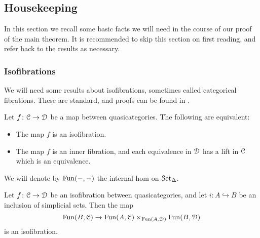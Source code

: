 \documentclass[main.tex]{subfiles}
\begin{document}
%


\subsection{Housekeeping}

In this section we recall some basic facts we will need in the course of our proof of the main theorem. It is recommended to skip this section on first reading, and refer back to the results as necessary.

\subsubsection{Isofibrations}

We will need some results about isofibrations, sometimes called categorical fibrations. These are standard, and proofs can be found in \cite{kerodon}.

\begin{proposition}
  \label{prop:characterization_of_isofibrations}
  Let $f\colon \mathcal{C} \to \mathcal{D}$ be a map between quasicategories. The following are equivalent:
  \begin{itemize}
    \item The map $f$ is an isofibration.

    \item The map $f$ is an inner fibration, and each equivalence in $\mathcal{D}$ has a lift in $\mathcal{C}$ which is an equivalence.
  \end{itemize}
\end{proposition}

We will denote by $\mathrm{Fun}(-, -)$ the internal hom on $\mathcal{S}\mathrm{et}_{\Delta}$.
\begin{proposition}
  Let $f\colon \mathcal{C} \to \mathcal{D}$ be an isofibration between quasicategories, and let $i\colon A \hookrightarrow B$ be an inclusion of simplicial sets. Then the map
  \begin{equation*}
    \mathrm{Fun}(B, \mathcal{C}) \to \mathrm{Fun}(A, \mathcal{C}) \times_{\mathrm{Fun}(A, \mathcal{D})} \mathrm{Fun}(B, \mathcal{D})
  \end{equation*}
  is an isofibration.
\end{proposition}
\end{document}
